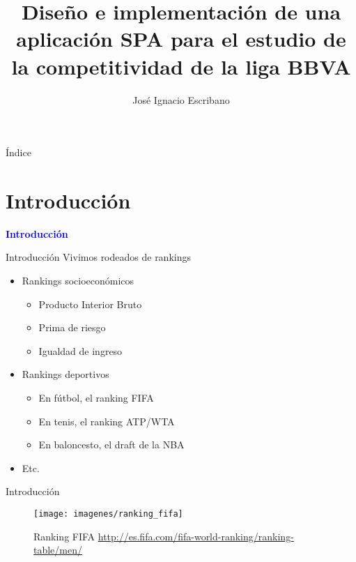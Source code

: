 \documentclass[10pt]{beamer}
\author{José Ignacio Escribano}
\title{Diseño e implementación de una aplicación SPA para el estudio de la competitividad de la liga BBVA}
\institute{Universidad Rey Juan Carlos}
\date{}
\begin{document}
	
	\begin{frame}
		\maketitle
	\end{frame}

	\begin{frame}[allowframebreaks]{Índice}
		\tableofcontents
	\end{frame}
	
	
	\section{Introducción}
	
	\begin{frame}
		\begin{center}
			\Huge\textbf{\textsf{\textcolor{blue}{Introducción}}}
		\end{center}
	\end{frame}
	
	\begin{frame}{Introducción}
		Vivimos rodeados de rankings
		
		\begin{itemize}
			\item Rankings socioeconómicos
			\begin{itemize}
				\item Producto Interior Bruto
				\item Prima de riesgo
				\item Igualdad de ingreso
			\end{itemize}
			\item Rankings deportivos
			\begin{itemize}
				\item En fútbol, el ranking FIFA
				\item En tenis, el ranking ATP/WTA
				\item En baloncesto, el draft de la NBA
			\end{itemize}
			\item Etc.
		\end{itemize}
	\end{frame}
	
	\begin{frame}{Introducción}
		\begin{figure}
			\centering
			\texttt{[image: imagenes/ranking\_fifa]}
			\caption{Ranking FIFA \url{http://es.fifa.com/fifa-world-ranking/ranking-table/men/}}
			\label{fig:ranking_fifa}
		\end{figure}
	\end{frame}
	
\end{document}
